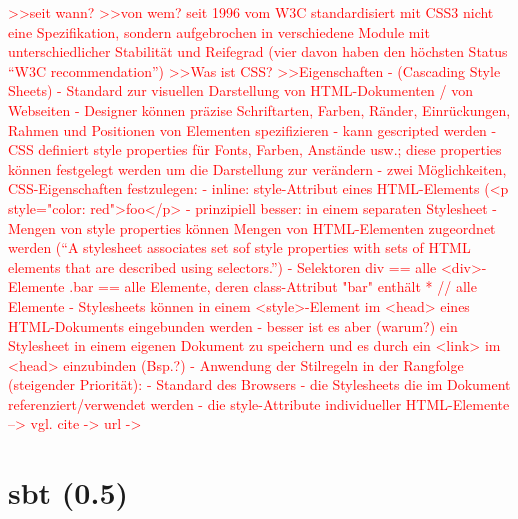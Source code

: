 \documentclass[a4paper, 12pt, hidelinks, listof=totoc, listoftables=totoc, bibliography=totoc]{scrreprt}
\newcommand{\TODO}[1]{\textcolor{red}{#1}\newline}
\begin{document}
\TODO{>>seit wann?
>>von wem?
  seit 1996 vom W3C standardisiert
  mit CSS3 nicht eine Spezifikation, sondern aufgebrochen in verschiedene Module mit unterschiedlicher Stabilität und Reifegrad (vier davon haben den höchsten Status "`W3C recommendation"')
>>Was ist CSS?
}
\TODO{>>Eigenschaften}
\TODO{  - (Cascading Style Sheets)}
\TODO{  - Standard zur visuellen Darstellung von HTML-Dokumenten / von Webseiten}
\TODO{  - Designer können präzise Schriftarten, Farben, Ränder, Einrückungen, Rahmen und Positionen von Elementen spezifizieren}
\TODO{  - kann gescripted werden}
\TODO{  - CSS definiert style properties für Fonts, Farben, Anstände usw.; diese properties können festgelegt werden um die Darstellung zur verändern}
\TODO{  - zwei Möglichkeiten, CSS-Eigenschaften festzulegen:}
\TODO{    - inline: style-Attribut eines HTML-Elements (<p style="color: red">foo</p>}
\TODO{    - prinzipiell besser: in einem separaten Stylesheet}
\TODO{      - Mengen von style properties können Mengen von HTML-Elementen zugeordnet werden ("`A stylesheet associates set sof style properties with sets of HTML elements that are described using selectors."')}
\TODO{      - Selektoren}
\TODO{        div  ==  alle <div>-Elemente}
\TODO{        .bar  ==  alle Elemente, deren class-Attribut "bar" enthält}
\TODO{        * // alle Elemente}
\TODO{      - Stylesheets können in einem <style>-Element im <head> eines HTML-Dokuments eingebunden werden}
\TODO{      - besser ist es aber (warum?) ein Stylesheet in einem eigenen Dokument zu speichern und es durch ein <link> im <head> einzubinden (Bsp.?)}
\TODO{  - Anwendung der Stilregeln in der Rangfolge (steigender Priorität):}
\TODO{    - Standard des Browsers}
\TODO{    - die Stylesheets die im Dokument referenziert/verwendet werden}
\TODO{    - die style-Attribute individueller HTML-Elemente}
\TODO{  -->  vgl. cite -> %
}
\TODO{  url -> %
}




\section{sbt (0.5)}
\end{document}
